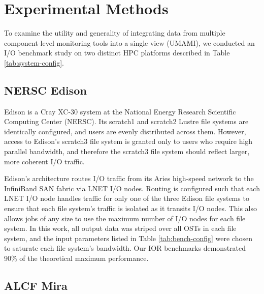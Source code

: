 

\section{Experimental Methods} \label{sec:platforms}

To examine the utility and generality of integrating data from multiple
component-level monitoring tools into a single view (UMAMI), we conducted an
I/O benchmark study on two distinct HPC platforms described in Table \ref{tab:system-config}.



\subsection{NERSC Edison} \label{sec:platforms/edison}

Edison is a Cray XC-30 system at the National Energy Research Scientific
Computing Center (NERSC).
Its scratch1 and scratch2 Lustre file systems are identically configured,
and users are evenly distributed across them.
However, access to Edison's scratch3 file system is granted only to users who require high parallel bandwidth, and therefore the scratch3 file system should reflect larger, more coherent I/O traffic.

Edison's architecture routes I/O traffic from its Aries high-speed network
to the InfiniBand SAN fabric via LNET I/O nodes.
Routing is configured such that each LNET I/O node handles traffic for only one of the three Edison file systems to ensure that each file system's traffic is isolated as it transits I/O nodes.
This also allows jobs of any size to use the maximum number of I/O nodes for each file system.
In this work, all output data was striped over all OSTs in each file system, and the input parameters listed in Table \ref{tab:bench-config} were chosen to saturate each file system's bandwidth.
Our IOR benchmarks demonstrated 90\% of the theoretical maximum performance.

\subsection{ALCF Mira} \label{sec:platforms/mira}

